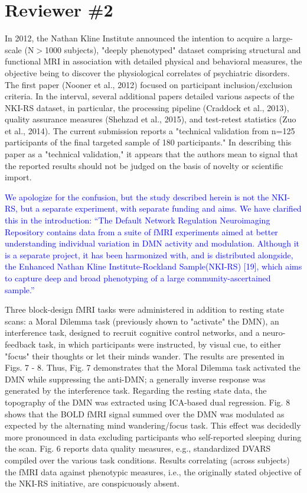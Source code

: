 \documentclass{article}
\newcommand{\RESPONSE}[1]{\textcolor{blue}{#1}}
\begin{document}
\section*{Reviewer \#2}

In 2012, the Nathan Kline Institute announced the intention to acquire a large-scale (N$>$1000 subjects), "deeply phenotyped" dataset comprising structural and functional MRI in association with detailed physical and behavioral measures, the objective being to discover the physiological correlates of psychiatric disorders. The first paper (Nooner et al., 2012) focused on participant inclusion/exclusion criteria. In the interval, several additional papers detailed various aspects of the NKI-RS dataset, in particular, the processing pipeline (Craddock et al., 2013), quality assurance measures (Shehzad et al., 2015), and test-retest statistics (Zuo et al., 2014). The current submission reports a "technical validation from n=125 participants of the final targeted sample of 180 participants." In describing this paper as a "technical validation," it appears that the authors mean to signal that the reported results should not be judged on the basis of novelty or
scientific import.

\RESPONSE{We apologize for the confusion, but the study described herein is not the NKI-RS, but a separate experiment, with separate funding and aims. We have clarified this in the introduction: ``The Default Network Regulation Neuroimaging Repository contains data from a suite of fMRI experiments aimed at better understanding individual variation in DMN activity and modulation.  Although it is a separate project, it has been harmonized with, and is distributed alongside, the Enhanced Nathan Kline Institute-Rockland Sample(NKI-RS) [19], which aims to capture deep and broad phenotyping of a large community-ascertained sample.''} 


Three block-design fMRI tasks were administered in addition to resting state scans: a Moral Dilemma task (previously shown to "activate" the DMN), an interference task, designed to recruit cognitive control networks, and a neuro-feedback task, in which participants were instructed, by visual cue, to either "focus" their thoughts or let their minds wander. The results are presented in Figs. 7 - 8. Thus, Fig. 7 demonstrates that the Moral Dilemma task activated the DMN while suppressing the anti-DMN; a generally inverse response was generated by the interference task. Regarding the resting state data, the topography of the DMN was extracted using ICA-based dual regression. Fig. 8 shows that the BOLD fMRI signal summed over the DMN was modulated as expected by the alternating mind wandering/focus task. This effect was decidedly more pronounced in data excluding participants who self-reported sleeping during the scan. Fig. 6 reports data quality measures, e.g., standardized
DVARS compiled over the various task conditions. Results correlating (across subjects) the fMRI data against phenotypic measures, i.e., the originally stated objective of the NKI-RS initiative, are conspicuously absent.
\end{document}
